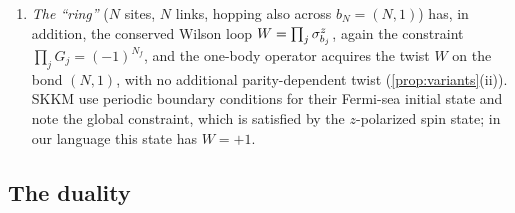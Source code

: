 \begin{remark}
\begin{enumerate}[label=(\alph*)]
\eqref{eq:H} and \eqref{eq:gauss}.  Then $\prod_jG_j=(-1)^{N_f}$ identically, so only the
charge configurations with $\prod_jq_j=(-1)^{N_f}$ occur, and for a matter state of definite
parity the sum in SKKM's Eq.~(5) runs over the $2^{N-1}$ configurations of a parity hyperplane.
The open chain is the restriction of our model to the invariant subspace $\{\sxb{N}=+1\}$
(\cref{prop:variants}(i)).  The boundary link $b_N$ is a static $\Z_2$ flux through the right
end; it makes $\sxb{N}=(-1)^{N_f}\prod_jG_j$ a free conserved label, removes the parity constraint,
and makes the charges exactly i.i.d.  For the $z$-polarized gauge state and \emph{any} matter state, the
sector laws of the two conventions differ by a density bounded by $2$ (\cref{prop:variants}(i)).  This is
harmless for all localization \emph{upper} bounds (\cref{rem:productlaws}(c)).
\item \emph{The ``ring''} ($N$ sites, $N$ links, hopping also across $b_N=(N,1)$) has, in
addition, the conserved Wilson loop $W=\prod_j\sigma^{z}_{b_{j}}$, again the constraint
$\prod_jG_j=(-1)^{N_f}$, and the one-body operator acquires the twist $W$ on the bond $(N,1)$,
with no additional parity-dependent twist (\cref{prop:variants}(ii)).  SKKM use periodic boundary
conditions for their Fermi-sea initial state and note the global constraint, which is satisfied by
the $z$-polarized spin state; in our language this state has $W=+1$.
\end{enumerate}
\end{remark}

\subsection{The duality}\label{sec:model:duality}

